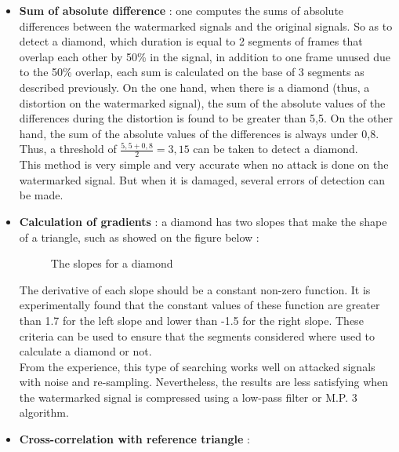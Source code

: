 \begin{itemize}
\item \textbf{Sum of absolute difference} : one computes the sums of absolute differences between the watermarked signals and the original signals. So as to detect a diamond, which duration is equal to 2 segments of frames that overlap each other by 50\% in the signal, in addition to one frame unused due to the 50\% overlap, each sum is calculated on the base of 3 segments as described previously. On the one hand, when there is a diamond (thus, a distortion on the watermarked signal), the sum of the absolute values of the differences during the distortion is found to be greater than 5,5. On the other hand, the sum of the absolute values of the differences is always under 0,8. Thus, a threshold of $\frac{5,5 + 0,8}{2} = 3,15$ can be taken to detect a diamond.\\
This method is very simple and very accurate when no attack is done on the watermarked signal. But when it is damaged, several errors of detection can be made.
\item \textbf{Calculation of gradients} : a diamond has two slopes that make the shape of a triangle, such as showed on the figure below :
\begin{figure}[H]
\caption{\label{slopes} The slopes for a diamond}
\end{figure}
The derivative of each slope should be a constant non-zero function. It is experimentally found that the constant values of these function are greater than 1.7 for the left slope and lower than -1.5 for the right slope. These criteria can be used to ensure that the segments considered where used to calculate a diamond or not.\\
From the experience, this type of searching works well on attacked signals with noise and re-sampling. Nevertheless, the results are less satisfying when the watermarked signal is compressed using a low-pass filter or M.P. 3 algorithm.
\item \textbf{Cross-correlation with reference triangle} : 
\end{itemize}
